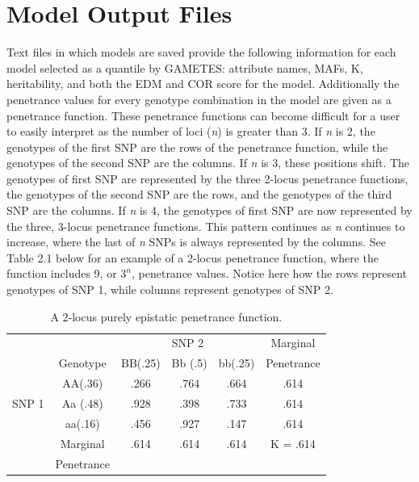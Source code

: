 \documentclass{report}
\begin{document}
\section{Model Output Files} 
Text files in which models are saved provide the following information for each model selected as a quantile by GAMETES: attribute names, MAFs, K, heritability, and both the EDM and COR score for the model.  Additionally the penetrance values for every genotype combination in the model are given as a penetrance function.  These penetrance functions can become difficult for a user to easily interpret as the number of loci (\emph{n}) is greater than 3.  If \emph{n} is 2, the genotypes of the first SNP are the rows of the penetrance function, while the genotypes of the second SNP are the columns.  If \emph{n} is 3, these positions shift.  The genotypes of first SNP are represented by the three 2-locus penetrance functions, the genotypes of the second SNP are the rows, and the genotypes of the third SNP are the columns.  If \emph{n} is 4, the genotypes of first SNP are now represented by the three, 3-locus penetrance functions.  This pattern continues as \emph{n} continues to increase, where the last of \emph{n} SNPs is always represented by the columns.  See Table 2.1 below for an example of a 2-locus penetrance function, where the function includes 9, or $3^n$, penetrance values.  Notice here how the rows represent genotypes of SNP 1, while columns represent genotypes of SNP 2.

\begin{table}[!h] \centering\caption{A 2-locus purely epistatic penetrance function.}\label{Pen2}
\begin{tabular}{p{1cm}c ||c | c | c || c }
&&\multicolumn{3}{c||}{SNP 2}&Marginal\\
&Genotype&BB(.25)&Bb (.5)&bb(.25)&Penetrance\\ \hline \hline
&AA(.36) & .266 & .764 & .664 & .614 \\ \cline{2-6}
SNP 1 &Aa (.48) & .928 & .398 & .733 & .614 \\ \cline{2-6}
&aa(.16) & .456 & .927 & .147 & .614 \\ \hline \hline
&Marginal & .614 & .614 &.614 & K = .614 \\
&Penetrance&&&&
\end{tabular}
\end{table}
\end{document}
